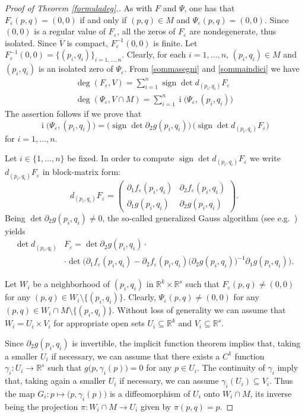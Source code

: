 \documentclass[a4paper]{amsart}
\numberwithin{equation}{section}
\DeclareMathOperator{\idx}{\mathrm{i}}
\newcommand{\cl}[1]{\overline{#1}}
\newcommand{\R}{\mathbb{R}}
\newcommand{\sign}{\mathop\mathrm{sign}\nolimits}
\newcommand{\e}{\varepsilon}
\begin{document}
\begin{proof}[Proof of Theorem \ref{formuladeg}.]
As with $F$ and $\Psi$, one has that $F_\e(p,q)=(0,0)$ if and only if $(p,q)\in M$ and 
$\Psi_\e(p,q)=(0,0)$. Since $(0,0)$ is a regular value of $F_\e$, all the zeros of 
$F_\e$ are nondegenerate, thus isolated. Since $\cl{V}$ is compact, $F_\e^{-1}(0,0)$ 
is finite. 
Let $F_\e^{-1}(0,0)=\{(p_i,q_i)\}_{i=1,\ldots,n}$. Clearly, for each $i=1,\ldots,n$, 
$(p_i,q_i)\in M$ and $(p_i,q_i)$ is an isolated zero of $\Psi_\e$. From \eqref{sommasegni}
and \eqref{sommaindici} we have
\begin{gather*}
 \deg(F_\e,V)=\sum_{i=1}^n\sign\det d_{(p_i,q_i)}F_\e\\
 \deg(\Psi_\e,V\cap M)=\sum_{i=1}^n\idx\big(\Psi_\e,(p_i,q_i)\big)
\end{gather*}
The assertion follows if we prove that
\begin{equation}\label{indiciloc}
 \idx\big(\Psi_\e,(p_i,q_i)\big)
      =\big(\sign\det\partial_2 g(p_i,q_i)\big)\,\big(\sign\det d_{(p_i,q_i)}F_\e\big)
\end{equation}
for $i=1,\ldots,n$.

Let $i\in\{1,\ldots,n\}$ be fixed. In order to compute $\sign\det d_{(p_i,q_i)}F_\e$ we 
write $d_{(p_i,q_i)}F_\e$ in block-matrix form:
\[
 d_{(p_i,q_i)}F_\e = 
\begin{pmatrix}
 \partial_1 f_\e(p_i,q_i) & \partial_2 f_\e(p_i,q_i)\\
\partial_1 g(p_i,q_i) & \partial_2 g(p_i,q_i)
\end{pmatrix}.
\]
Being $\det\partial_2 g(p_i,q_i)\neq 0$, the so-called generalized Gauss algorithm (see 
e.g.\ \cite{G}) yields
\begin{equation}
\begin{split}\label{fsgnsch}
 \det d_{(p_i,q_i)} & F_\e = \det\partial_2 g(p_i,q_i)\cdot\\
     &\cdot\det \Big(\partial_1 f_\e(p_i,q_i)-\partial_2 f_\e(p_i,q_i)
                     \big(\partial_2 g(p_i,q_i)\big)^{-1}\partial_1 g(p_i,q_i)\Big).
\end{split}
\end{equation}

Let $W_i$ be a neighborhood of $(p_i,q_i)$ in $\R^k\times\R^s$ such that $F_\e(p,q)\neq(0,0)$ 
for any $(p,q)\in W_i\setminus\{(p_i,q_i)\}$. Clearly, $\Psi_\e(p,q)\neq (0,0)$ for any 
$(p,q)\in W_i\cap M\setminus\{(p_i,q_i)\}$. Without loss of generality we can assume that
$W_i=U_i\times V_i$ for appropriate open sets $U_i\subseteq\R^k$ and $V_i\subseteq\R^s$.

Since $\partial_2g(p_i,q_i)$ is invertible, the implicit function theorem implies that, taking
a smaller $U_i$ if necessary, we can assume that there exists a $C^1$ function 
$\gamma_i:U_i\to\R^s$ such that $g\big(p,\gamma_i(p)\big)=0$ for any $p\in U_i$. The continuity
of $\gamma_i$ imply that, taking again a smaller $U_i$ if necessary, we can assume 
$\gamma_i(U_i)\subseteq V_i$. Thus the map $G_i:p\mapsto\big(p,\gamma_i(p)\big)$ is a 
diffeomorphism of $U_i$ onto $W_i\cap M$, its inverse being the projection 
$\pi:W_i\cap M\to U_i$ given by $\pi(p,q)=p$.


\end{proof}
\end{document}
